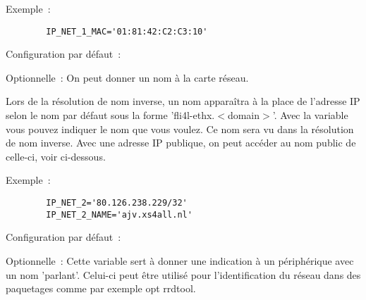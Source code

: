 \begin{description}
{    Exemple~:

\begin{example}
\begin{verbatim}
        IP_NET_1_MAC='01:81:42:C2:C3:10'
\end{verbatim}
\end{example}
    }


  Configuration par défaut~: 

  {Optionnelle~: On peut donner un nom à la carte réseau.

    Lors de la résolution de nom inverse, un nom apparaîtra à la place de
    l'adresse IP selon le nom par défaut sous la forme 'fli4l-ethx.$<$domain$>$'.
    Avec la variable  vous pouvez indiquer le nom que
    vous voulez. Ce nom sera vu dans la résolution de nom inverse. Avec une
    adresse IP publique, on peut accéder au nom public de celle-ci,
    voir ci-dessous.

    Exemple~:

\begin{example}
\begin{verbatim}
        IP_NET_2='80.126.238.229/32'
        IP_NET_2_NAME='ajv.xs4all.nl'
\end{verbatim}
\end{example}
    }



  Configuration par défaut~: 

    {Optionnelle~: Cette variable sert à donner une indication à un
    périphérique avec un nom 'parlant'. Celui-ci peut être utilisé pour
    l'identification du réseau dans des paquetages comme par exemple opt rrdtool.
    }

\end{description}
